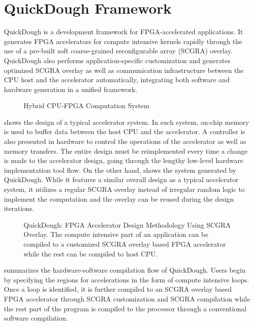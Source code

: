 \section{QuickDough Framework}\label{sec:framework}
QuickDough is a development framework for FPGA-accelerated applications. It generates FPGA
accelerators for compute intensive kernels rapidly through the use of a pre-built soft
coarse-grained reconfigurable array (SCGRA) overlay. QuickDough also performs application-specific
customization and generates optimized SCGRA overlay as well as communication infrastructure between
the CPU host and the accelerator automatically, integrating both software and hardware generation in
a unified framework.

\begin{figure}
\centering
{}
\hfill
{}
\caption{Hybrid CPU-FPGA Computation System}
\label{fig:FPGA-accelerator}
\end{figure}

 shows the design of a typical accelerator system. In such system,
on-chip memory is used to buffer data between the host CPU and the accelerator. A controller is also
presented in hardware to control the operations of the accelerator as well as memory transfers. The
entire design must be reimplemented every time a change is made to the accelerator design, going
through the lengthy low-level hardware implementation tool flow. 
On the other hand,  shows the system generated by QuickDough. While it
features a similar overall design as a typical accelerator system, it utilizes a regular SCGRA
overlay instead of irregular random logic to implement the computation and the overlay can be reused
during the design iterations.  

\begin{figure}
    \caption{QuickDough: FPGA Accelerator Design Methodology Using SCGRA Overlay. The compute
        intensive part of an application can be compiled to a customized SCGRA overlay based FPGA
    accelerator while the rest can be compiled to host CPU.}
    \label{fig:framework}
\end{figure}

 summarizes the hardware-software compilation flow of QuickDough.
Users begin by specifying the regions for accelerations in the form of compute intensive loops.
Once a loop is identified, it is further compiled to an SCGRA overlay based FPGA
accelerator through SCGRA customization and SCGRA compilation while the rest part of the program is
compiled to the processor through a conventional software compilation.

